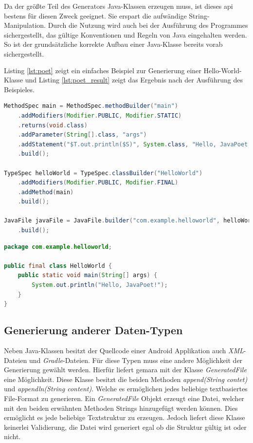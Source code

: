 Da der größte Teil des Generators Java-Klassen erzeugen muss, ist dieses \ac{api} bestens für diesen Zweck geeignet. Sie erspart die aufwändige String-Manipulation. Durch die Nutzung wird auch bei der Ausführung des Programmes sichergestellt, das gültige Konventionen und Regeln von Java eingehalten werden. So ist der grundsätzliche korrekte Aufbau einer Java-Klasse bereits vorab sichergestellt.

Listing \ref{lst:poet} zeigt ein einfaches Beispiel zur Generierung einer Hello-World-Klasse und Listing \ref{lst:poet_result} zeigt das Ergebnis nach der Ausführung des Beispieles.

\begin{lstlisting}[label=lst:poet,
language=java,
firstnumber=1,
caption=Beispiel für die Generation einer Hallo-World-Klasse \cite{poet}.]				   
MethodSpec main = MethodSpec.methodBuilder("main")
	.addModifiers(Modifier.PUBLIC, Modifier.STATIC)
	.returns(void.class)
	.addParameter(String[].class, "args")
	.addStatement("$T.out.println($S)", System.class, "Hello, JavaPoet!")
	.build();

TypeSpec helloWorld = TypeSpec.classBuilder("HelloWorld")
	.addModifiers(Modifier.PUBLIC, Modifier.FINAL)
	.addMethod(main)
	.build();

JavaFile javaFile = JavaFile.builder("com.example.helloworld", helloWorld)
	.build();
\end{lstlisting}

\begin{lstlisting}[label=lst:poet_result,
language=java,
firstnumber=1,
caption=Ergebnis der Generation von Listing \ref{lst:poet} \cite{poet}.]				   
package com.example.helloworld;

public final class HelloWorld {
	public static void main(String[] args) {
		System.out.println("Hello, JavaPoet!");
	}
}
\end{lstlisting}

\subsection{Generierung anderer Daten-Typen}

Neben Java-Klassen besitzt der Quellcode einer Android Applikation auch \textit{XML}-Dateien und \textit{Gradle}-Dateien. Für diese Typen muss eine andere Möglichkeit der Generierung gewählt werden. Hierfür liefert \acf{gemara} mit der Klasse \textit{GeneratedFile} eine Möglichkeit. Diese Klasse besitzt die beiden Methoden \textit{append(String contet)} und \textit{appendln(String content)}. Welche es ermöglichen jedes beliebige textbasiertes File-Format zu generieren. Ein \textit{GeneratedFile} Objekt erzeugt eine Datei, welcher mit den beiden erwähnten Methoden Strings hinzugefügt werden können. Dies ermöglicht es jede beliebige Textstruktur zu erzeugen. Jedoch liefert diese Klasse keinerlei Validierung, die Datei wird generiert egal ob die Struktur gültig ist oder nicht.

